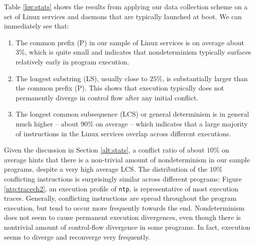 Table \ref{hw:stats} shows the results from applying our data
collection scheme on a set of Linux services and daemons
that are typically launched at boot. We can immediately see that:
\begin{enumerate}

\item The common prefix (P) 
in our sample of Linux services is on average about $3\%$,
which is quite small and indicates that nondeterminism 
typically surfaces relatively early in program execution. 

\item The longest substring (LS), usually close to $25\%$,
is substantially larger than the common prefix (P).
This shows that execution typically does not permanently
diverge in control flow after any initial conflict.

\item The longest common subsequence (LCS) or general determinism
is in general much higher -- about $90\%$ on average -- 
which indicates that a large majority of instructions 
in the Linux services overlap across
different executions. 

\end{enumerate}

Given the discussion in Section \ref{alt:stats}, a conflict ratio
of about $10\%$ on average hints that there is a non-trivial amount of nondeterminism 
in our sample programs, despite a very high average LCS.
The distribution of the $10\%$ conflicting instructions
is surprisingly similar across different programs: 
Figure \ref{ntp:tracech2}, an execution profile of \texttt{ntp}, is representative
of most execution traces. Generally,
conflicting instructions are spread throughout
the program execution, but tend to occur more frequently
towards the end. Nondeterminism does not seem to cause permanent 
execution divergences, even though there is nontrivial amount
of control-flow divergence in some programs. In fact, execution seems to
diverge and reconverge very frequently.


